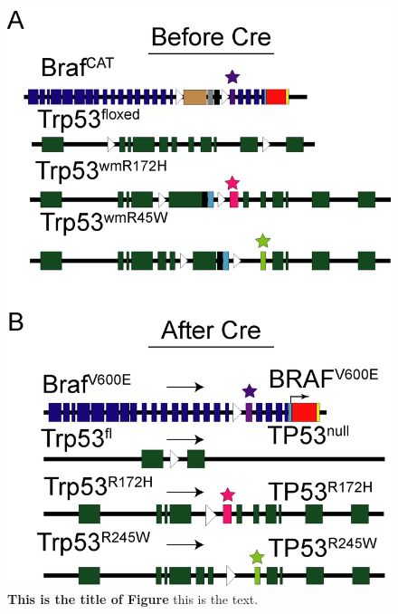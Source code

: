 \begin{figure}
\hypertarget{fig:04}{%
\centering
\includegraphics[width=1\textwidth,height=\textheight]{images/p53_1.png}
\caption{\textbf{This is the title of Figure} this is the text.}\label{fig:04}
}
\end{figure}

